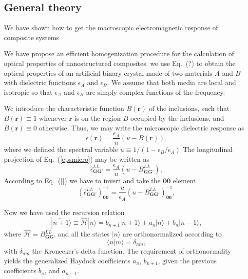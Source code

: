 \documentclass[preprint,12pt]{revtex4}
\newcommand{\op}[1]{{\hat{\mathcal#1}}}
\begin{document}
\subsection{General theory}
\label{Theory}
We have shown how to get the macroscopic electromagnetic response of
composite systems 

We have propose an efficient homogenization procedure for the
calculation of optical properties of nanostructured composites.  we
use Eq.~(?) to obtain the optical properties of an
artificial binary crystal made of two materials $A$ and $B$ with
dielectric functions $\epsilon_A$ and $\epsilon_B$. We assume that
both media are local and isotropic so that $\epsilon_A$ and
$\epsilon_B$ are simply complex functions of the frequency.

We introduce the characteristic function $B(\mathbf r)$ of the
inclusions, such that $B(\mathbf r)\equiv1$ whenever $\mathbf r$ is on
the region $B$ occupied by the inclusions, and $B(\mathbf r)\equiv0$
otherwise. Thus, we may write the microscopic dielectric response as
\begin{equation}
  \label{epsmicro}
  \epsilon(\mathbf r)= 
  \frac{\epsilon_A}{u}\left( u-B(\mathbf r) \right),
\end{equation}
where we defined the spectral variable $u\equiv
1/(1-\epsilon_B/\epsilon_A)$ %
The
longitudinal projection of Eq.~(\ref{epsmicro}) may be
written as
\begin{equation}
  \label{epsll}
  \hat \epsilon^{LL}_{\mathbf G\mathbf G'}= \frac{\epsilon_A}{u}\left(
    u- B ^{LL}_{\mathbf G\mathbf G'}\right),
\end{equation}
 According to Eq.~(\ref{}) we have to invert and take the $\mathbf
 0\mathbf 0$ element
\begin{equation}
  \label{epslli}
\left(  \hat \epsilon^{LL}_{\mathbf G\mathbf G'}\right)^{-1}_{\mathbf 0\mathbf 0}= 
  \frac{u}{\epsilon_A}\left(  u-
  B_{\mathbf G\mathbf G'}^{LL}\right)^{-1}_{\mathbf 0\mathbf 0}, 
\end{equation}

Now we have used the recursion relation
\begin{equation}\label{n+1}
  |\widetilde{n+1}\rangle\equiv \op H |n\rangle = b_{n+1}|n+1\rangle + a_n
  |n\rangle +   b_{n}|n-1\rangle, 
\end{equation}
where $\op H=B_{\mathbf G\mathbf G'}^{LL}$ and all the states
$|n\rangle$ are orthonormalized according to
\begin{equation}\label{ortonor}
  \langle n|m\rangle =  \delta_{nm},
\end{equation}
with $\delta_{nm}$ the Kronecker's delta function. The requirement of
orthonormality yields the generalized Haydock coefficients $a_n$,
$b_{n+1}$, given the previous coefficients $b_{n}$, and $a_{n-1}$. 
\end{document}
